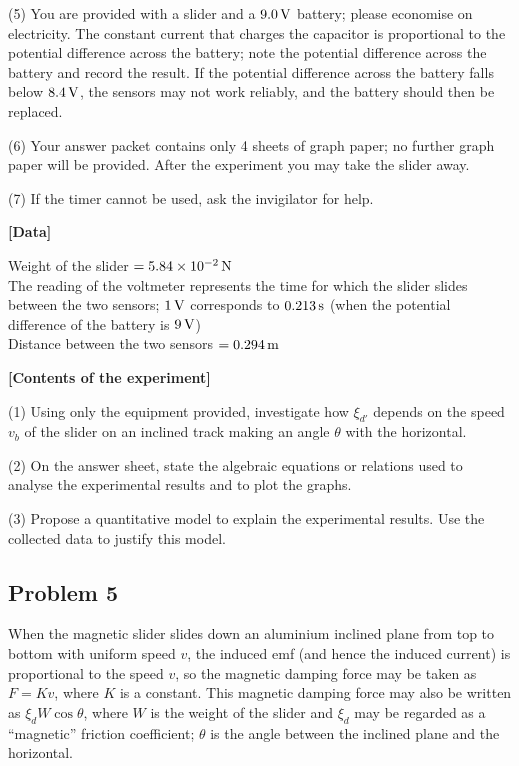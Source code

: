(5) You are provided with a slider and a $9.0\,\mathrm{V}$ battery; please economise on electricity. The constant current that charges the capacitor is proportional to the potential difference across the battery; note the potential difference across the battery and record the result. If the potential difference across the battery falls below $8.4\,\mathrm{V}$, the sensors may not work reliably, and the battery should then be replaced.

(6) Your answer packet contains only 4 sheets of graph paper; no further graph paper will be provided. After the experiment you may take the slider away.

(7) If the timer cannot be used, ask the invigilator for help.

\textbf{[Data]}

\begin{center}
Weight of the slider $=5.84\times10^{-2}\,\mathrm{N}$\\[2pt]
The reading of the voltmeter represents the time for which the slider slides between the two sensors; $1\,\mathrm{V}$ corresponds to $0.213\,\mathrm{s}$ (when the potential difference of the battery is $9\,\mathrm{V}$)\\[2pt]
Distance between the two sensors $=0.294\,\mathrm{m}$
\end{center}

\textbf{[Contents of the experiment]}

(1) Using only the equipment provided, investigate how $\xi_{d'}$ depends on the speed $v_b$ of the slider on an inclined track making an angle $\theta$ with the horizontal.

(2) On the answer sheet, state the algebraic equations or relations used to analyse the experimental results and to plot the graphs.

(3) Propose a quantitative model to explain the experimental results. Use the collected data to justify this model.

\subsection*{Problem 5}

When the magnetic slider slides down an aluminium inclined plane from top to bottom with uniform speed $v$, the induced emf (and hence the induced current) is proportional to the speed $v$, so the magnetic damping force may be taken as $F=Kv$, where $K$ is a constant. This magnetic damping force may also be written as $\xi_dW\cos\theta$, where $W$ is the weight of the slider and $\xi_d$ may be regarded as a ``magnetic'' friction coefficient; $\theta$ is the angle between the inclined plane and the horizontal.

